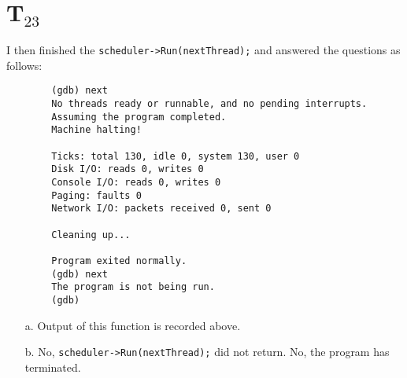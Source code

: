 \documentclass[letterpaper, 10pt]{article}
\begin{document}
	\section*{T$_{23}$}

	I then finished the {\tt scheduler->Run(nextThread);} and answered the questions as follows:

	\begin{verbatim}
		(gdb) next
		No threads ready or runnable, and no pending interrupts.
		Assuming the program completed.
		Machine halting!

		Ticks: total 130, idle 0, system 130, user 0
		Disk I/O: reads 0, writes 0
		Console I/O: reads 0, writes 0
		Paging: faults 0
		Network I/O: packets received 0, sent 0

		Cleaning up...

		Program exited normally.
		(gdb) next
		The program is not being run.
		(gdb)
	\end{verbatim}

	\begin{itemize}
		\item[a.]{Output of this function is recorded above.}
		\item[b.]{No, {\tt scheduler->Run(nextThread);} did not return. No, the program has terminated.}
	\end{itemize}
\end{document}

